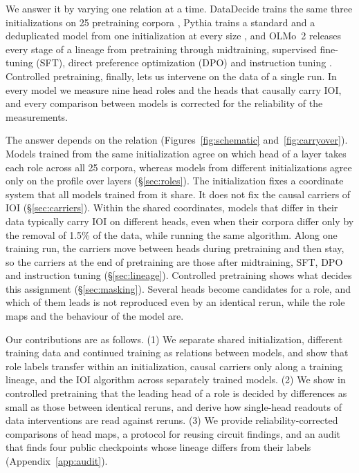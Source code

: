 \documentclass[11pt]{article}
\begin{document}
We answer it by varying one relation at a time.
DataDecide trains the same three initializations on 25 pretraining corpora \citep{magnusson2025datadecide}, Pythia trains a standard and a deduplicated model from one initialization at every size \citep{biderman2023pythia}, and OLMo~2 releases every stage of a lineage from pretraining through midtraining, supervised fine-tuning (SFT), direct preference optimization (DPO) and instruction tuning \citep{olmo2024olmo2}.
Controlled pretraining, finally, lets us intervene on the data of a single run.
In every model we measure nine head roles and the heads that causally carry IOI, and every comparison between models is corrected for the reliability of the measurements.

The answer depends on the relation (Figures~\ref{fig:schematic} and~\ref{fig:carryover}).
Models trained from the same initialization agree on which head of a layer takes each role across all 25 corpora, whereas models from different initializations agree only on the profile over layers (\S\ref{sec:roles}).
The initialization fixes a coordinate system that all models trained from it share.
It does not fix the causal carriers of IOI (\S\ref{sec:carriers}).
Within the shared coordinates, models that differ in their data typically carry IOI on different heads, even when their corpora differ only by the removal of 1.5\% of the data, while running the same algorithm.
Along one training run, the carriers move between heads during pretraining and then stay, so the carriers at the end of pretraining are those after midtraining, SFT, DPO and instruction tuning (\S\ref{sec:lineage}).
Controlled pretraining shows what decides this assignment (\S\ref{sec:masking}).
Several heads become candidates for a role, and which of them leads is not reproduced even by an identical rerun, while the role maps and the behaviour of the model are.

Our contributions are as follows.
(1) We separate shared initialization, different training data and continued training as relations between models, and show that role labels transfer within an initialization, causal carriers only along a training lineage, and the IOI algorithm across separately trained models.
(2) We show in controlled pretraining that the leading head of a role is decided by differences as small as those between identical reruns, and derive how single-head readouts of data interventions are read against reruns.
(3) We provide reliability-corrected comparisons of head maps, a protocol for reusing circuit findings, and an audit that finds four public checkpoints whose lineage differs from their labels (Appendix~\ref{app:audit}).
\end{document}
